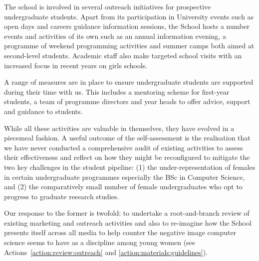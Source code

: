 % 

The school is involved in several outreach initiatives for prospective undergraduate
students. Apart from its participation in University events such
as open days and careers guidance information sessions, the School
hosts a number events and activities of its own such as an annual
information evening, a programme of weekend programming activities
and summer camps both aimed at second-level students. Academic staff also make targeted school visits with an increased focus in
recent years on girls schools.

A range of  measures are in place to ensure undergraduate students
are supported during their time with us. This includes a mentoring
scheme for first-year students, a team of programme directors
and year heads to offer advice, support
and guidance to students.

While all these activities are valuable in themselves, they have 
evolved in a piecemeal fashion. A useful outcome of the self-assessment is the realisation that we have never conducted
a comprehensive audit of existing activities to assess their 
effectiveness and reflect on how they might be reconfigured 
to mitigate the two key challenges in the student pipeline:
(1) the under-representation of females in certain undergraduate
programmes especially the BSc in Computer Science, and 
(2) the comparatively small number of female undergraduates
who opt to progress to graduate research studies.


Our response to the former is twofold: to undertake a 
root-and-branch review of existing marketing and outreach
activities and also to re-imagine how the School presents
itself across all media to help counter the negative image
computer science seems to have as a discipline  among young
women (see Actions~\ref{action:review:outreach} and \ref{action:materials:guidelines}).



